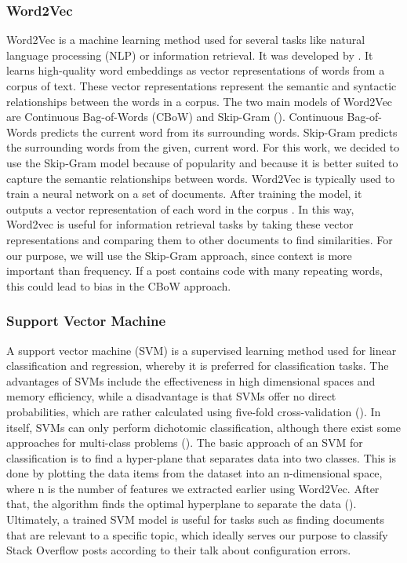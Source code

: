 \documentclass[english,bachelor]{swsLeipzig}
\begin{document}
\subsubsection{Word2Vec}
Word2Vec is a machine learning method used for several tasks like natural language processing (NLP) or information 
retrieval. It was developed by \citet{mikolov:2013}. It learns high-quality word embeddings as vector representations of words from a corpus of text. These vector representations represent the semantic and syntactic relationships between the words in a corpus. The two main models of Word2Vec are Continuous Bag-of-Words (CBoW) and Skip-Gram (\citet{tian:2020}). Continuous Bag-of-Words predicts the current word from its surrounding words. Skip-Gram predicts the surrounding words from the given, current word. For this work, we decided to use the Skip-Gram model because of popularity and because it is better suited to capture the semantic relationships between words. Word2Vec is typically used to train a neural network on a set of documents. After training the model, it outputs a vector representation of each word in the corpus \citet{li:2019}. In this way, Word2vec is useful for information retrieval tasks by taking these vector representations and comparing them to other documents to find similarities. For our purpose, we will use the Skip-Gram approach, since context is more important than frequency. If a post contains code with many repeating words, this could lead to bias in the CBoW approach.

\subsubsection{Support Vector Machine}
A support vector machine (SVM) is a supervised learning method used for linear classification and regression, whereby it 
is preferred for classification tasks. The advantages of SVMs include the effectiveness in high dimensional spaces and memory efficiency, while a disadvantage is that SVMs offer no direct probabilities, which are rather calculated using five-fold cross-validation (\citeauthor{scikit:nd}). In itself, SVMs can only perform dichotomic classification, although there exist some approaches for multi-class problems (\citet{franc:2002}). The basic approach of an SVM for classification is to find a hyper-plane that separates data into two classes. This is done by plotting the data items from the dataset into an n-dimensional space, where n is the number of features we extracted earlier using Word2Vec. After that, the algorithm finds the optimal hyperplane to separate the data (\citet{geeks:2023}). Ultimately, a trained SVM model is useful for tasks such as finding documents that are relevant to a specific topic, which ideally serves our purpose to classify Stack Overflow posts according to their talk about configuration errors.
\end{document}
